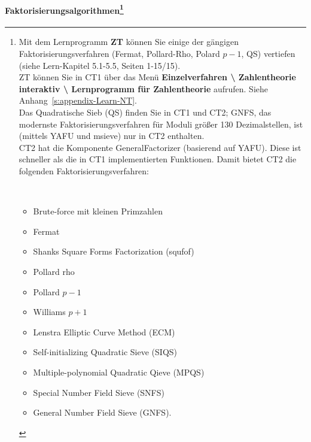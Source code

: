 \begin{refsegment}
\paragraph*{Faktorisierungsalgorithmen\footnote{%
    Mit dem Lernprogramm \textbf{ZT} können Sie einige der gängigen
    Faktorisierungsverfahren (Fermat, Pollard-Rho, Polard $p-1$, QS) vertiefen
    (siehe Lern-Kapitel 5.1-5.5, Seiten 1-15/15).\\
    ZT können Sie in CT1 über das Menü
    \textbf{Einzelverfahren \textbackslash{} Zahlentheorie
    interaktiv \textbackslash{} Lernprogramm für Zahlentheorie} aufrufen.
    Siehe Anhang~\ref{s:appendix-Learn-NT}.\\
     Das Quadratische Sieb (QS) finden Sie in CT1 und CT2;
    GNFS, das modernste Faktorisierungsverfahren für Moduli größer 130
    Dezimalstellen, ist (mittels YAFU und msieve) nur in CT2 enthalten.\\
   CT2 hat die Komponente GeneralFactorizer
  (basierend auf YAFU). Diese ist schneller als die in CT1
  implementierten Funktionen.
  Damit bietet CT2 die folgenden Faktorisierungsverfahren:
\strut\\[-1.5\baselineskip]
\begin{multicols}{2}
  \begin{itemize}[nosep,label=-]
   \item Brute-force mit kleinen Primzahlen
   \item Fermat
   \item Shanks Square Forms Factorization (squfof)
   \item Pollard rho
   \item Pollard $p-1$
   \item Williams $p+1$
   \item Lenstra Elliptic Curve Method (ECM)
   \item Self-initializing Quadratic Sieve (SIQS)
   \item Multiple-polynomial Quadratic Qieve (MPQS)
   \item Special Number Field Sieve (SNFS)
   \item General Number Field Sieve (GNFS).
  \end{itemize}
\end{multicols}
}}
\mbox{}%


\end{refsegment}
